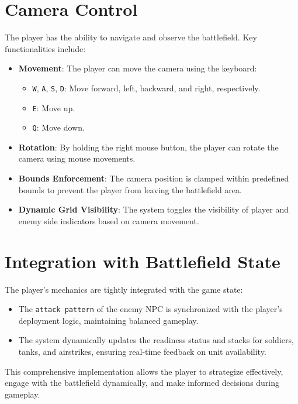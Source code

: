 \section{Camera Control}
The player has the ability to navigate and observe the battlefield. Key functionalities include:
\begin{itemize}
    \item \textbf{Movement}: The player can move the camera using the keyboard:
    \begin{itemize}
        \item \texttt{W}, \texttt{A}, \texttt{S}, \texttt{D}: Move forward, left, backward, and right, respectively.
        \item \texttt{E}: Move up.
        \item \texttt{Q}: Move down.
    \end{itemize}
    \item \textbf{Rotation}: By holding the right mouse button, the player can rotate the camera using mouse movements.
    \item \textbf{Bounds Enforcement}: The camera position is clamped within predefined bounds to prevent the player from leaving the battlefield area.
    \item \textbf{Dynamic Grid Visibility}: The system toggles the visibility of player and enemy side indicators based on camera movement.
\end{itemize}

\section{Integration with Battlefield State}
The player's mechanics are tightly integrated with the game state:
\begin{itemize}
    \item The \texttt{attack pattern} of the enemy NPC is synchronized with the player's deployment logic, maintaining balanced gameplay.
    \item The system dynamically updates the readiness status and stacks for soldiers, tanks, and airstrikes, ensuring real-time feedback on unit availability.
\end{itemize}

This comprehensive implementation allows the player to strategize effectively, engage with the battlefield dynamically, and make informed decisions during gameplay.
